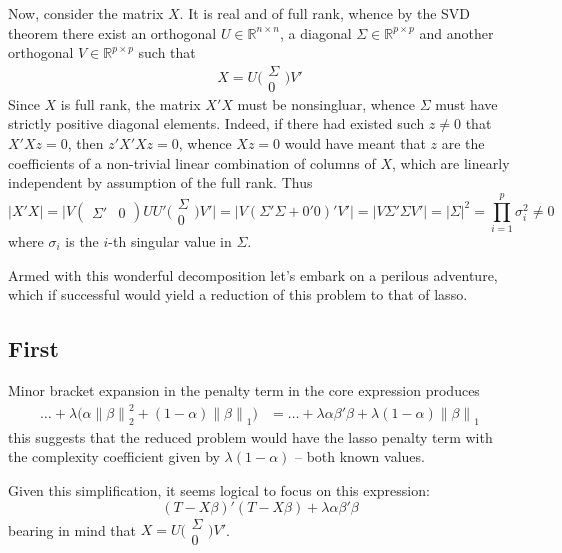 \documentclass[a4paper]{article}
\newcommand{\nrm}[1]{{\left\| #1 \right \|}}
\newcommand{\Real}{\mathbb{R}}
\begin{document}
Now, consider the matrix $X$. It is real and of full rank, whence by the SVD
theorem there exist an orthogonal $U\in \Real^{n\times n}$, a diagonal $\Sigma\in \Real^{p\times p}$ and another orthogonal $V\in \Real^{p\times p}$ such that 
\[X = U \Big(\begin{smallmatrix}\Sigma \\ 0\end{smallmatrix}\Big) V'\]
Since $X$ is full rank, the matrix $X'X$ must be nonsingluar, whence $\Sigma$ must have strictly positive diagonal elements. Indeed, if there had existed such $z\neq 0$ that $X'Xz = 0$, then $z'X'Xz = 0$, whence $Xz = 0$ would have meant that $z$ are the coefficients of a non-trivial linear combination of columns of $X$, which are linearly independent by assumption of the full rank. Thus
\[\lvert X'X \rvert =
\lvert V(\begin{smallmatrix}\Sigma' & 0\end{smallmatrix})UU'\Big(\begin{smallmatrix}\Sigma \\ 0\end{smallmatrix}\Big)V'\rvert
= \lvert V(\Sigma'\Sigma + 0'0)' V'\rvert = \lvert V\Sigma'\Sigma V'\rvert = \lvert \Sigma\rvert^2 = \prod_{i=1}^p \sigma_i^2 \neq 0\]
where $\sigma_i$ is the $i$-th singular value in $\Sigma$.

Armed with this wonderful decomposition let's embark on a perilous
adventure, which if successful would yield a reduction of this problem to
that of lasso.

\subsection*{First} %
\label{sub:first}

Minor bracket expansion in the penalty term in the core expression
produces
\begin{align*}
 	\ldots + \lambda\big( \alpha \nrm{\beta}_2^2 + (1-\alpha) \nrm{\beta}_1 \big) &= \ldots + \lambda \alpha \beta'\beta + \lambda (1-\alpha) \nrm{\beta}_1
\end{align*}
this suggests that the reduced problem would have the lasso penalty term with the complexity coefficient given by $\lambda(1-\alpha)$ -- both known values.

Given this simplification, it seems logical to focus on this expression:
\[(T-X\beta)'(T-X\beta) + \lambda \alpha \beta'\beta\]
bearing in mind that $X = U \Big(\begin{smallmatrix}\Sigma \\ 0\end{smallmatrix}\Big) V'$.
\end{document}
